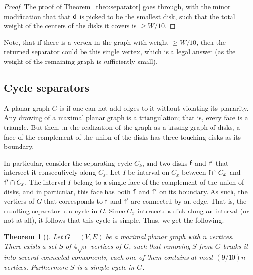 \documentclass[12pt]{article}
\newtheorem{theorem}{Theorem}[section]
\theoremstyle{remark}\theoremheaderfont{\sf}\theorembodyfont{\upshape}\newtheorem{defn}[theorem]{Definition}
\newcommand{\HLink}[2]{\hyperref[#2]{#1~\ref*{#2}}}
\newcommand{\thmlab}[1]{{\label{theo:#1}}}
\newcommand{\thmref}[1]{\HLink{Theorem}{theo:#1}}
\newcommand{\SepSet}{S}
\newcommand{\Graph}{{G}}
\newcommand{\Vertices}{{V}}\newcommand{\Edges}{{E}}
\newcommand{\emphi}[1]{\emphic{#1}{#1}}
\begin{document}
\begin{proof}
    The proof of \thmref{separator} goes through, with the minor
    modification that that $\mathsf{d}$ is picked to be the smallest disk,
    such that the total weight of the centers of the disks it covers
    is $\geq W/10$.
\end{proof}

Note, that if there is a vertex in the graph with weight $\geq W/10$,
then the returned separator could be this single vertex, which is a
legal answer (as the weight of the remaining graph is sufficiently
small).

\subsection{Cycle separators}

A planar graph $\Graph$ is \emphi{maximal} if one can not add edges to
it without violating its planarity. Any drawing of a maximal planar
graph is a triangulation; that is, every face is a triangle.  But
then, in the realization of the graph as a kissing graph of disks, a
face of the complement of the union of the disks has three touching
disks as its boundary. 


In particular, consider the separating cycle
$C_k$, and two disks $\mathsf{f}$ and $\mathsf{f}'$ that intersect it
consecutively along $C_x$. Let $I$ be interval on $C_x$ between
$\mathsf{f} \cap C_x$ and $\mathsf{f}'\cap C_x$. The interval $I$ belong to a
single face of the complement of the union of disks, and in
particular, this face has both $\mathsf{f}$ and $\mathsf{f}'$ on its
boundary. As such, the vertices of $\Graph$ that corresponds to
$\mathsf{f}$ and $\mathsf{f}'$ are connected by an edge. That is, the
resulting separator is a cycle in $\Graph$. Since $C_x$ intersects a
disk along an interval (or not at all), it follows that this cycle is
simple.  Thus, we get the following.


\begin{theorem}[\cite{m-fsscs-86}]
    \thmlab{separator:2}Let $\Graph = (\Vertices,\Edges)$ be a maximal planar graph with
    $n$ vertices. There exists a set $\SepSet$ of $4 \sqrt{n}$
    vertices of $\Graph$, such that removing $S$ from $\Graph$ breaks
    it into several connected components, each one of them contains at
    most $(9/10)n$ vertices. Furthermore $\SepSet$ is a simple cycle
    in $\Graph$.
\end{theorem}
\end{document}
